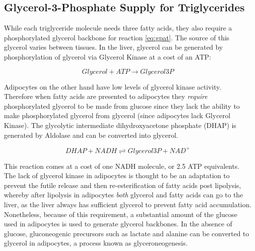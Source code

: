 \documentclass{tufte-handout}
\begin{document}
\subsection{Glycerol-3-Phosphate Supply for Triglycerides}

While each triglyceride molecule needs three fatty acids, they also require a phosphorylated glycerol backbone for reaction \ref{eq:gpat}.  The source of this glycerol varies between tissues.  In the liver, glycerol can be generated by phosphorylation of glycerol via Glycerol Kinase at a cost of an ATP:

\begin{equation}
Glycerol + ATP \rightarrow Glycerol3P
\end{equation}

Adipocytes on the other hand have low levels of glycerol kinase activity.  Therefore when fatty acids are presented to adipocytes they \emph{require} phosphorylated glycerol to be made from glucose since they lack the ability to make phosphorylated glycerol from glycerol (since adipocytes lack Glycerol Kinase).  The glycolytic intermediate dihydroxyacetone phosphate (DHAP) is generated by Aldolase and can be converted into glycerol.

\begin{equation}\label{eq:g3pdh}
DHAP + NADH \rightleftharpoons Glycerol3P + NAD^+
\end{equation}

This reaction comes at a cost of one NADH molecule, or 2.5 ATP equivalents. The lack of glycerol kinase in adipocytes is thought to be an adaptation to prevent the futile release and then re-esterification of fatty acids post lipolysis, whereby after lipolysis in adipocytes \emph{both} glycerol and fatty acids can go to the liver, as the liver always has sufficient glycerol to prevent fatty acid accumulation. Nonetheless, because of this requirement, a substantial amount of the glucose used in adipocytes is used to generate glycerol backbones. In the absence of glucose, gluconeogenic precursors such as lactate and alanine can be converted to glycerol in adipocytes, a process known as glyceroneogenesis.
\end{document}
